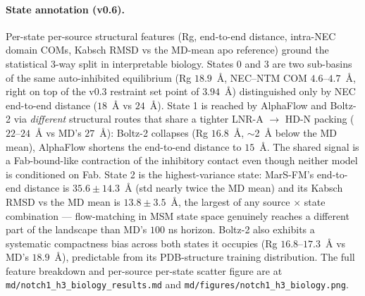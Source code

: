 \documentclass[11pt]{article}
\begin{document}
\begin{enumerate}[leftmargin=*,itemsep=2pt]
        \paragraph{State annotation (v0.6).} Per-state per-source
        structural features (Rg, end-to-end distance, intra-NEC
        domain COMs, Kabsch RMSD vs the MD-mean apo reference) ground
        the statistical 3-way split in interpretable biology. States
        0 and 3 are two sub-basins of the same auto-inhibited
        equilibrium (Rg $18.9$~\AA, NEC--NTM COM $4.6$--$4.7$~\AA,
        right on top of the v0.3 restraint set point of $3.94$~\AA)
        distinguished only by NEC end-to-end distance ($18$~\AA{} vs
        $24$~\AA). State 1 is reached by AlphaFlow and Boltz-2 via
        \emph{different} structural routes that share a tighter
        LNR-A $\to$ HD-N packing ($22$--$24$~\AA{} vs MD's $27$~\AA):
        Boltz-2 collapses (Rg $16.8$~\AA, $\sim$2~\AA{} below the MD
        mean), AlphaFlow shortens the end-to-end distance to
        $15$~\AA. The shared signal is a Fab-bound-like contraction
        of the inhibitory contact even though neither model is
        conditioned on Fab. State 2 is the highest-variance state:
        MarS-FM's end-to-end distance is $35.6 \pm 14.3$~\AA{} (std
        nearly twice the MD mean) and its Kabsch RMSD vs the MD mean
        is $13.8 \pm 3.5$~\AA, the largest of any source $\times$
        state combination --- flow-matching in MSM state space
        genuinely reaches a different part of the landscape than
        MD's $100$ ns horizon. Boltz-2 also exhibits a systematic
        compactness bias across both states it occupies (Rg
        $16.8$--$17.3$~\AA{} vs MD's $18.9$~\AA), predictable from
        its PDB-structure training distribution. The full feature
        breakdown and per-source per-state scatter figure are at
        \texttt{md/notch1\_h3\_biology\_results.md} and
        \texttt{md/figures/notch1\_h3\_biology.png}.


\end{enumerate}
\end{document}
